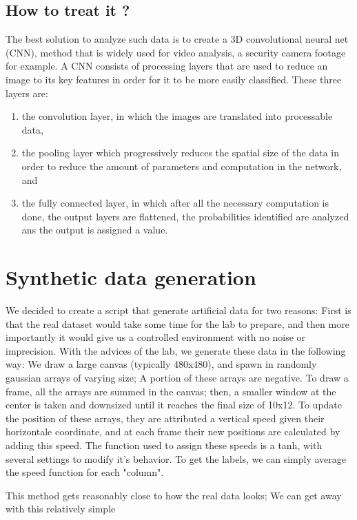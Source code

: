 \documentclass[10pt,conference]{IEEEtran}
\begin{document}
\subsection{How to treat it ?}
The best solution to analyze such data is to create a 3D convolutional neural net (CNN), method that is widely used for video analysis, a security camera footage for example. A CNN consists of processing layers that are used to reduce an image to its key features in order for it to be more easily classified. These three layers are:
\begin{enumerate}
  \item the convolution layer, in which the images are translated into processable data,
  \item the pooling layer which progressively reduces the spatial size of the data in order to reduce the amount of parameters and computation in the network, and
  \item the fully connected layer, in which after all the necessary computation is done, the output layers are flattened, the probabilities identified are analyzed ans the output is assigned a value.
\end{enumerate}

\section{Synthetic data generation}
We decided to create a script that generate artificial data for two reasons: First is that the real dataset would take some time for the lab to prepare, and then more importantly it would give us a controlled environment with no noise or imprecision. 
With the advices of the lab, we generate these data in the following way: We draw a large canvas (typically 480x480), and spawn in randomly gaussian arrays of varying size; A portion of these arrays are negative. To draw a frame, all the arrays are summed in the canvas; then, a smaller window at the center is taken and downsized until it reaches the final size of 10x12.
To update the position of these arrays, they are attributed a vertical speed given their horizontale coordinate, and at each frame their new positions are calculated by adding this speed. The function used to assign these speeds is a tanh, with several settings to modify it's behavior. 
To get the labels, we can simply average the speed function for each "column".

This method gets reasonably close to how the real data looks; We can get away with this relatively simple 
\end{document}
